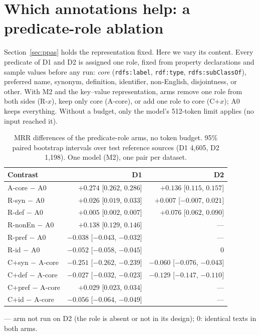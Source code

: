 
\section{Which annotations help: a predicate-role ablation}
\label{app:roles}

Section~\ref{sec:ppas} holds the representation fixed. Here we vary its
content. Every predicate of D1 and D2 is assigned one role, fixed from
property declarations and sample values before any run: \emph{core}
(\texttt{rdfs:label}, \texttt{rdf:type}, \texttt{rdfs:subClassOf}),
preferred name, synonym, definition, identifier, non-English, disjointness,
or other. With M2 and the key--value representation, arms remove one role
from both sides (R-$x$), keep only core (A-core), or add one role to core
(C+$x$); A0 keeps everything. Without a budget, only the model's 512-token
limit applies (no input reached it).

\begin{table}[t]
\centering
\caption{MRR differences of the predicate-role arms, no token budget.
95\% paired bootstrap intervals over test reference sources (D1 4,605,
D2 1,198). One model (M2), one pair per dataset.}
\label{tab:roles}
\begin{tabular}{lrr}
\toprule
Contrast & D1 & D2 \\
\midrule
A-core $-$ A0 & $+0.274$ [$0.262$, $0.286$] & $+0.136$ [$0.115$, $0.157$] \\
R-syn $-$ A0 & $+0.026$ [$0.019$, $0.033$] & $+0.007$ [$-0.007$, $0.021$] \\
R-def $-$ A0 & $+0.005$ [$0.002$, $0.007$] & $+0.076$ [$0.062$, $0.090$] \\
R-nonEn $-$ A0 & $+0.138$ [$0.129$, $0.146$] & --- \\
R-pref $-$ A0 & $-0.038$ [$-0.043$, $-0.032$] & --- \\
R-id $-$ A0 & $-0.052$ [$-0.058$, $-0.045$] & $0$ \\
C+syn $-$ A-core & $-0.251$ [$-0.262$, $-0.239$] & $-0.060$ [$-0.076$, $-0.043$] \\
C+def $-$ A-core & $-0.027$ [$-0.032$, $-0.023$] & $-0.129$ [$-0.147$, $-0.110$] \\
C+pref $-$ A-core & $+0.029$ [$0.023$, $0.034$] & --- \\
C+id $-$ A-core & $-0.056$ [$-0.064$, $-0.049$] & --- \\
\bottomrule
\end{tabular}

\smallskip
{\footnotesize --- arm not run on D2 (the role is absent or not in its
design); $0$: identical texts in both arms.}
\end{table}


